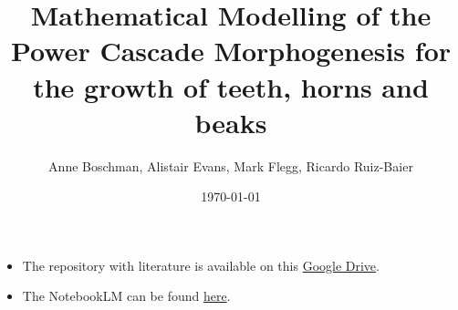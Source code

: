 \documentclass{article}
\title{Mathematical Modelling of the Power Cascade Morphogenesis  for the growth of teeth, horns and beaks}
\author{Anne Boschman, Alistair Evans, Mark Flegg, Ricardo Ruiz-Baier}
\date{\today}
\begin{document}
\maketitle


\tableofcontents

\begin{itemize}
\item The repository with literature is available on this \href{https://drive.google.com/drive/folders/1rwgtdOq9_lcx8QRcSFMhI2Bl2aBjoMgS?usp=drive_link}{Google Drive}.
\item The NotebookLM can be found \href{https://notebooklm.google.com/notebook/5cec064c-f7a0-4c5c-a2e3-b5d4385e6968}{here}.
\end{itemize}










\end{document}

